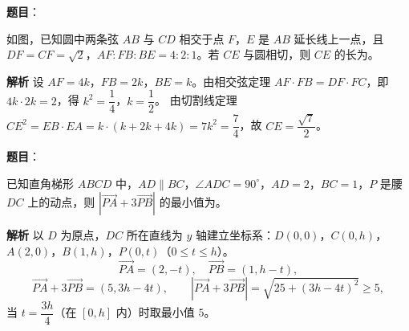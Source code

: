 \begin{answer}

\textbf{题目}：

如图，已知圆中两条弦 $AB$ 与 $CD$ 相交于点 $F$，$E$ 是 $AB$ 延长线上一点，且 $DF=CF=\sqrt2$，$AF:FB:BE=4:2:1$。若 $CE$ 与圆相切，则 $CE$ 的长为\gkblank{}。
\nopagebreak[4]
\begin{center}\end{center}
\nopagebreak[4]
\textbf{解析}
设 $AF=4k$，$FB=2k$，$BE=k$。由相交弦定理 $AF\cdot FB=DF\cdot FC$，即 $4k\cdot2k=2$，得 $k^2=\dfrac14$，$k=\dfrac12$。
由切割线定理 $CE^2=EB\cdot EA=k\cdot(k+2k+4k)=7k^2=\dfrac74$，故 $CE=\dfrac{\sqrt7}2$。


\end{answer}
\begin{answer}

\textbf{题目}：

已知直角梯形 $ABCD$ 中，$AD\parallel BC$，$\angle ADC=90^\circ$，$AD=2$，$BC=1$，$P$ 是腰 $DC$ 上的动点，则 $|\overrightarrow{PA}+3\overrightarrow{PB}|$ 的最小值为\gkblank{}。

\textbf{解析}
以 $D$ 为原点，$DC$ 所在直线为 $y$ 轴建立坐标系：$D(0,0)$，$C(0,h)$，$A(2,0)$，$B(1,h)$，$P(0,t)$（$0\leqslant t\leqslant h$）。
\nopagebreak[4]
\[\overrightarrow{PA}=(2,-t),\quad\overrightarrow{PB}=(1,h-t),\]
\nopagebreak[4]
\[\overrightarrow{PA}+3\overrightarrow{PB}=(5,3h-4t),\qquad |\overrightarrow{PA}+3\overrightarrow{PB}|=\sqrt{25+(3h-4t)^2}\geqslant5,\]
当 $t=\dfrac{3h}4$（在 $[0,h]$ 内）时取最小值 $5$。


\end{answer}
